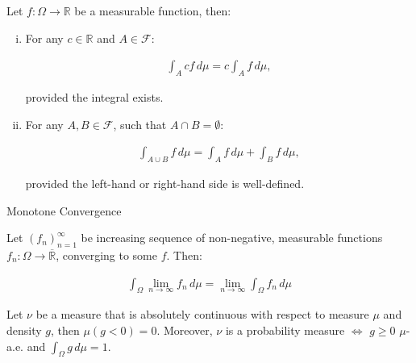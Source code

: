\documentclass[10pt,landscape]{article}
\renewcommand{\geq}{\geqslant}
\newcommand{\CalF}{\mathcal{F}}
\begin{document}
\begin{multicols}{3}
\begin{exercise}{3.6}{}
    Let $f: \Omega \to \mathbb{R}$ be a measurable function, then:

        \begin{enumerate}[(i)]
            \setlength{\parskip}{0em}
            \item For any $c \in \mathbb{R}$ and $A \in \CalF$:

                \begin{align*}
                    \int_A cf \, d\mu = c \int_A f \, d\mu,
                \end{align*}
            
            provided the integral exists.
            \item For any $A, B \in \CalF$, such that $A \cap B = \emptyset$:

                \begin{align*}
                    \int_{A \cup B} f \,d\mu = \int_{A} f \,d\mu + \int_{B} f \,d\mu,
                \end{align*}

            provided the left-hand or right-hand side is well-defined.
        \end{enumerate}

\end{exercise}

\begin{theorem}{3.8}{Monotone Convergence}

    Let $(f_n)_{n=1}^{\infty}$ be increasing sequence of non-negative, measurable functions $f_n: \Omega \to \overline{\mathbb{R}}$, converging to some $f$. Then:

        \begin{align*}
            \int_{\Omega} \lim_{n \to \infty} f_n \,d\mu = \lim_{n \to \infty} \int_{\Omega} f_n \,d\mu
        \end{align*}

\end{theorem}

\begin{exercise}{3.15}{}

    Let $\nu$ be a measure that is absolutely continuous with respect to measure $\mu$ and density $g$, then $\mu(g < 0) = 0$. Moreover, $\nu$ is a probability measure $\Leftrightarrow$ $g \geq 0$ $\mu$-a.e. and $\int_{\Omega} g \, d\mu = 1$.

\end{exercise}

\begin{proposition}{3.16}{}


\end{proposition}
\end{multicols}
\end{document}
